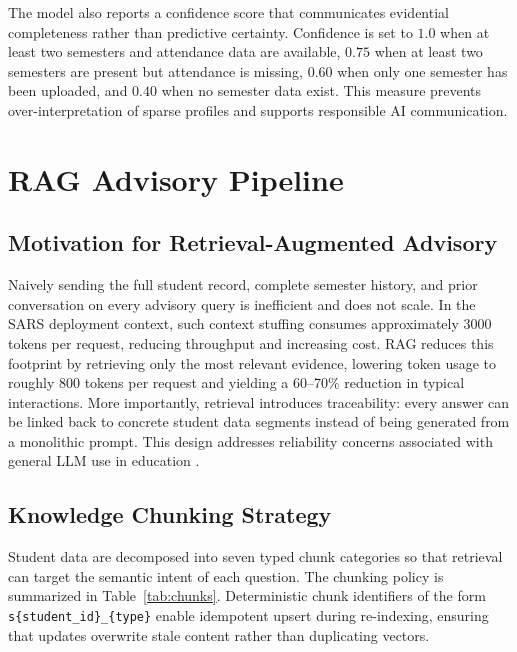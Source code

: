 \documentclass[conference]{IEEEtran}
\begin{document}
The model also reports a confidence score that communicates evidential completeness rather than predictive certainty. Confidence is set to $1.0$ when at least two semesters and attendance data are available, $0.75$ when at least two semesters are present but attendance is missing, $0.60$ when only one semester has been uploaded, and $0.40$ when no semester data exist. This measure prevents over-interpretation of sparse profiles and supports responsible AI communication.

\section{RAG Advisory Pipeline}
\subsection{Motivation for Retrieval-Augmented Advisory}
Naively sending the full student record, complete semester history, and prior conversation on every advisory query is inefficient and does not scale. In the SARS deployment context, such context stuffing consumes approximately 3000 tokens per request, reducing throughput and increasing cost. RAG reduces this footprint by retrieving only the most relevant evidence, lowering token usage to roughly 800 tokens per request and yielding a 60--70\% reduction in typical interactions. More importantly, retrieval introduces traceability: every answer can be linked back to concrete student data segments instead of being generated from a monolithic prompt. This design addresses reliability concerns associated with general LLM use in education \cite{kasneci2023chatgpt,lewis2020rag,gao2023rag}.

\subsection{Knowledge Chunking Strategy}
Student data are decomposed into seven typed chunk categories so that retrieval can target the semantic intent of each question. The chunking policy is summarized in Table~\ref{tab:chunks}. Deterministic chunk identifiers of the form \texttt{s\{student\_id\}\_\{type\}} enable idempotent upsert during re-indexing, ensuring that updates overwrite stale content rather than duplicating vectors.
\end{document}
